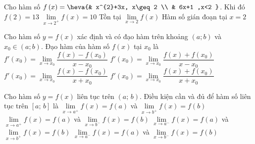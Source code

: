 \begin{ex}%
  Cho hàm số $f\left( x \right)= \heva{& x^{2}+3x, x\geq 2 \\
  & 6x+1 ,x<2 }$. Khi đó
 \choiceTF 
  {$f\left(  2 \right)=13$}
   {\True $\lim\limits_{x\to 2^{+}}f(x)=10$}
  {Tồn tại  $\lim\limits_{x\to 2}f(x)$}
  {\True Hàm số gián đoạn  tại $x=2$}
\end{ex}

\begin{ex}%
	Cho hàm số $y=f(x)$ xác định và có đạo hàm trên khoảng $(a; b)$ và $x_0 \in(a; b)$.  Đạo hàm của hàm số $f(x)$ tại $x_0$ là
	 \choice
		{\True $f'\left(x_0\right)=\lim\limits_{x\to  x_0}\dfrac{f(x)-f\left(x_0\right)}{x-x_0}$}
		{$f'\left(x_0\right)=\lim\limits_{x\to  x_0}\dfrac{f(x)+f\left(x_0\right)}{x-x_0}$}
		 {$f'\left(x_0\right)=\lim\limits_{x\to x_0}\dfrac{f(x)-f\left(x_0\right)}{x+x_0}$}
		{$f'\left(x_0\right)=\lim\limits_{x\to  x_0}\dfrac{f(x)+f\left(x_0\right)}{x+x_0}$}
\end{ex}

\begin{ex}%
	Cho hàm số $y=f(x)$ liên tục trên $\left(a;\,b \right)$. Điều kiện  cần và đủ để hàm số liên tục trên $\left[a;\,b \right]$ là
	\choice 
		 {$\lim\limits_{x \to a^+}f(x)=f\left( a \right)$ và $\lim\limits_{x \to b^+}f(x)=f\left( b \right)$}
		 {\True $\lim\limits_{x \to a^+}f(x)=f\left( a \right)$ và $\lim\limits_{x \to b^-}f(x)=f\left( b \right)$}
		{$\lim\limits_{x \to a^-}f(x)=f\left(  a \right)$ và $\lim\limits_{x \to b^+}f(x)=f\left( b \right)$}
		{$\lim\limits_{x \to a^-}f(x)=f\left( a \right)$  và $\lim\limits_{x \to b^-}f(x)=f\left( b \right)$}
\end{ex}
